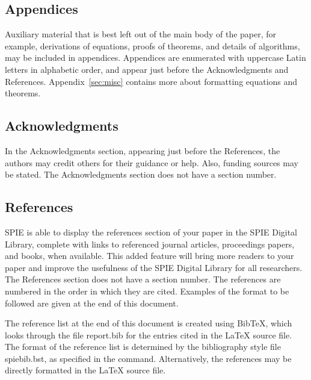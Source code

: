 \documentclass[]{spie}  %
\begin{document}
\subsection{Appendices}
Auxiliary material that is best left out of the main body of the paper, for example, derivations of equations, proofs of theorems, and details of algorithms, may be included in appendices.  Appendices are enumerated with uppercase Latin letters in alphabetic order, and appear just before the Acknowledgments and References. Appendix~\ref{sec:misc} contains more about formatting equations and theorems.

\subsection{Acknowledgments}
In the Acknowledgments section, appearing just before the References, the authors may credit others for their guidance or help.  Also, funding sources may be stated.  The Acknowledgments section does not have a section number.

\subsection{References}
SPIE is able to display the references section of your paper in the SPIE Digital Library, complete with links to referenced journal articles, proceedings papers, and books, when available. This added feature will bring more readers to your paper and improve the usefulness of the SPIE Digital Library for all researchers. The References section does not have a section number.  The references are numbered in the order in which they are cited.  Examples of the format to be followed are given at the end of this document.  

The reference list at the end of this document is created using BibTeX, which looks through the file {\ttfamily report.bib} for the entries cited in the LaTeX source file.  The format of the reference list is determined by the bibliography style file {\ttfamily spiebib.bst}, as specified in the \verb|| command.  Alternatively, the references may be directly formatted in the LaTeX source file.
\end{document}
